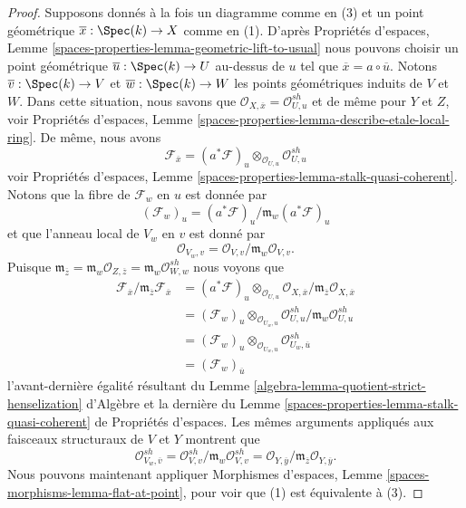 \begin{proof}
\medskip\noindent
Supposons donnés à la fois un diagramme comme en (3) et un point géométrique
$\overline{x} : \Spec(k) \to X$ comme en (1). D'après
Propriétés d'espaces, Lemme
\ref{spaces-properties-lemma-geometric-lift-to-usual}
nous pouvons choisir un point géométrique $\overline{u} : \Spec(k) \to U$
au-dessus de $u$ tel que $\overline{x} = a \circ \overline{u}$.
Notons $\overline{v} : \Spec(k) \to V$ et
$\overline{w} : \Spec(k) \to W$ les points géométriques induits de
$V$ et $W$. Dans cette situation, nous savons que
$\mathcal{O}_{X, \overline{x}} = \mathcal{O}_{U, u}^{sh}$
et de même pour $Y$ et $Z$, voir
Propriétés d'espaces,
Lemme \ref{spaces-properties-lemma-describe-etale-local-ring}.
De même, nous avons
$$
\mathcal{F}_{\overline{x}} =
(a^*\mathcal{F})_u \otimes_{\mathcal{O}_{U, u}}
\mathcal{O}_{U, u}^{sh}
$$
voir
Propriétés d'espaces, Lemme \ref{spaces-properties-lemma-stalk-quasi-coherent}.
Notons que la fibre de $\mathcal{F}_w$ en $u$ est donnée par
$$
(\mathcal{F}_w)_u = (a^*\mathcal{F})_u/\mathfrak m_w(a^*\mathcal{F})_u
$$
et que l'anneau local de $V_w$ en $v$ est donné par
$$
\mathcal{O}_{V_w, v} = \mathcal{O}_{V, v}/\mathfrak m_w\mathcal{O}_{V, v}.
$$
Puisque $\mathfrak m_{\overline{z}} =
\mathfrak m_w \mathcal{O}_{Z, \overline{z}} =
\mathfrak m_w \mathcal{O}_{W, w}^{sh}$
nous voyons que
\begin{align*}
\mathcal{F}_{\overline{x}}/
\mathfrak m_{\overline{z}}\mathcal{F}_{\overline{x}} & =
(a^*\mathcal{F})_u \otimes_{\mathcal{O}_{U, u}}
\mathcal{O}_{X, \overline{x}}/
\mathfrak m_{\overline{z}}\mathcal{O}_{X, \overline{x}} \\
& =
(\mathcal{F}_w)_u \otimes_{\mathcal{O}_{U_w, u}}
\mathcal{O}_{U, u}^{sh}/\mathfrak m_w\mathcal{O}_{U, u}^{sh} \\
& = (\mathcal{F}_w)_u \otimes_{\mathcal{O}_{U_w, u}}
\mathcal{O}_{U_w, \overline{u}}^{sh} \\
& = (\mathcal{F}_w)_{\overline{u}}
\end{align*}
l'avant-dernière égalité résultant du
Lemme \ref{algebra-lemma-quotient-strict-henselization} d'Algèbre
et la dernière du
Lemme \ref{spaces-properties-lemma-stalk-quasi-coherent} de Propriétés d'espaces.
Les mêmes arguments appliqués aux faisceaux structuraux de $V$ et $Y$
montrent que
$$
\mathcal{O}_{V_w, \overline{v}}^{sh} =
\mathcal{O}_{V, v}^{sh}/\mathfrak m_w \mathcal{O}_{V, v}^{sh} =
\mathcal{O}_{Y, \overline{y}}/
\mathfrak m_{\overline{z}}\mathcal{O}_{Y, \overline{y}}.
$$
Nous pouvons maintenant appliquer
Morphismes d'espaces, Lemme \ref{spaces-morphisms-lemma-flat-at-point},
pour voir que (1) est équivalente à (3).


\end{proof}
